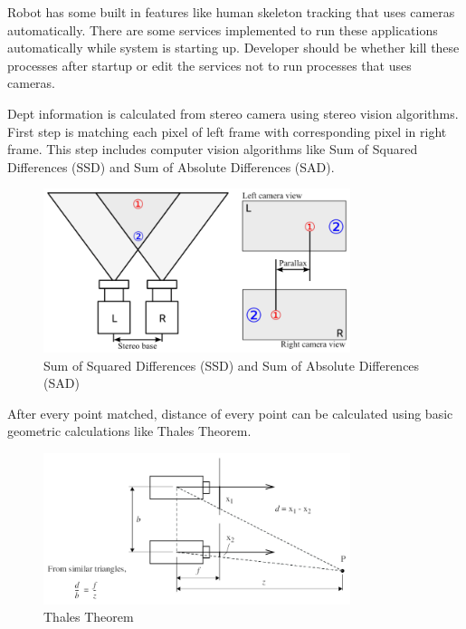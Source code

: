 \documentclass[12pt]{article}
\begin{document}
\begin{enumerate}
        Robot has some built in features like human skeleton tracking that uses cameras automatically. There are some services implemented to run these applications automatically while system is starting up. Developer should be whether kill these processes after startup or edit the services not to run processes that uses cameras. 

        Dept information is calculated from stereo camera using stereo vision algorithms. First step is matching each pixel of left frame with corresponding pixel in right frame. This step includes computer vision algorithms like Sum of Squared Differences (SSD) and Sum of Absolute Differences (SAD). 

        \begin{figure}[H]
            \centering
            \includegraphics[width=0.8\textwidth]{SSDSAD.png}
            \caption{Sum of Squared Differences (SSD) and Sum of Absolute Differences (SAD)}
        \end{figure}

        After every point matched, distance of every point can be calculated using basic geometric calculations like Thales Theorem. 

        \begin{figure}[H]
            \centering
            \includegraphics[width=0.8\textwidth]{Thales.png}
            \caption{Thales Theorem}
        \end{figure}


\end{enumerate}
\end{document}
